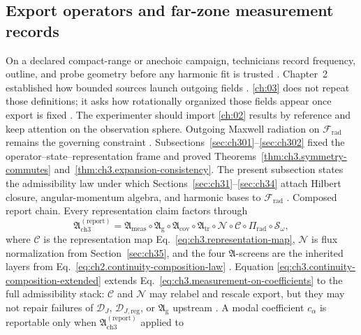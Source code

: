 \subsection{Export operators and far-zone measurement records}
\label{sec:ch303}
On a declared compact-range or anechoic campaign, technicians record frequency, outline, and probe geometry before any harmonic fit is trusted \cite{hansen1988}. Chapter~2 established how bounded sources launch outgoing fields \cite{stratton1941}. \ref{ch:03} does not repeat those definitions; it asks how rotationally organized those fields appear once export is fixed \cite{harrington2001}. The experimenter should import \ref{ch:02} results by reference and keep attention on the observation sphere. Outgoing Maxwell radiation on $\mathcal{F}_{\mathrm{rad}}$ remains the governing constraint \cite{stratton1941}.
Subsections~\ref{sec:ch301}--\ref{sec:ch302} fixed the operator--state--representation frame and
proved Theorems~\ref{thm:ch3.symmetry-commutes} and~\ref{thm:ch3.expansion-consistency}. The present
subsection states the admissibility law under which Sections~\ref{sec:ch31}--\ref{sec:ch34} attach
Hilbert closure, angular-momentum algebra, and harmonic bases to \(\mathcal{F}_{\mathrm{rad}}\)
\cite{stratton1941}.
Composed report chain. Every representation claim factors through
\begin{equation}
\label{eq:ch3.continuity-composition-extended}
\mathfrak{A}_{\mathrm{ch3}}^{\mathrm{(report)}}
=
\mathfrak{A}_{\mathrm{meas}}
\circ
\mathfrak{A}_{\mathrm{g}}
\circ
\mathfrak{A}_{\mathrm{cov}}
\circ
\mathfrak{A}_{\mathrm{tr}}
\circ
\mathcal{N}
\circ
\mathcal{C}
\circ
\Pi_{\mathrm{rad}}
\circ
\mathcal{S}_\omega,
\end{equation}
where \(\mathcal{C}\) is the representation map Eq.~\eqref{eq:ch3.representation-map},
\(\mathcal{N}\) is flux normalization from Section~\ref{sec:ch35}, and the four
\(\mathfrak{A}\)-screens are the inherited layers from
Eq.~\eqref{eq:ch2.continuity-composition-law} \cite{stratton1941}. Equation
\eqref{eq:ch3.continuity-composition-extended} extends Eq.~\eqref{eq:ch3.measurement-on-coefficients}
to the full admissibility stack: \(\mathcal{C}\) and \(\mathcal{N}\) may relabel and rescale export,
but they may not repair failures of \(\mathcal{D}_{J}\), \(\mathcal{D}_{J,\mathrm{reg}}\), or
\(\mathfrak{A}_{\mathrm{g}}\) upstream \cite{stratton1941}. A modal coefficient
\(c_\alpha\) is reportable only when \(\mathfrak{A}_{\mathrm{ch3}}^{\mathrm{(report)}}\) applied to
